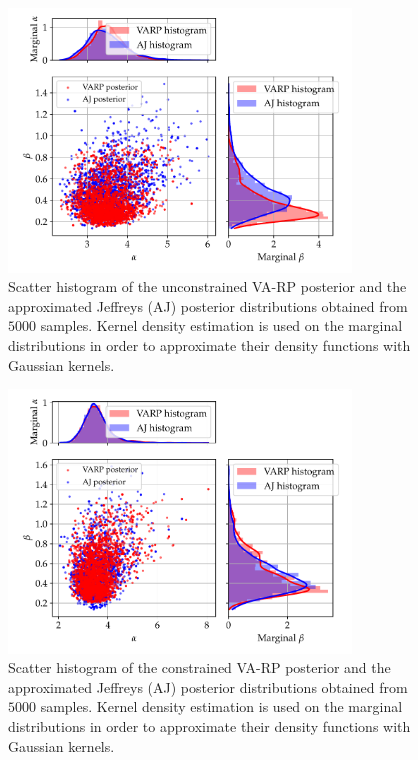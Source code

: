 

\begin{figure}[h]
    \centering
    \includegraphics[height=7cm]{figures/constr-frags/hist_post_marg_unconstrained_new.pdf}%
    \caption{Scatter histogram of the unconstrained VA-RP posterior and the approximated Jeffreys (AJ)  posterior distributions obtained from $5000$ samples. Kernel density estimation is used on the marginal distributions in order to approximate their density functions with Gaussian kernels.}
    \label{fig:scatterhist_unconstr}
\end{figure}

\begin{figure}[h]
    \centering
    \includegraphics[height=7cm]{figures/constr-frags/hist_post_marg_constrained_new.pdf}
    \caption{Scatter histogram of the constrained VA-RP posterior and the approximated Jeffreys (AJ)  posterior distributions obtained from $5000$ samples. Kernel density estimation is used on the marginal distributions in order to approximate their density functions with Gaussian kernels.}
    \label{fig:scatterhist_constr}
\end{figure}



